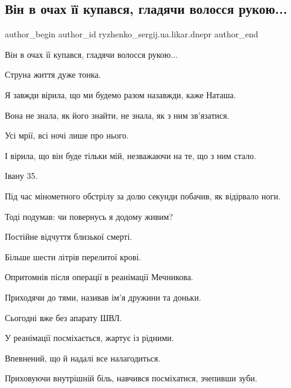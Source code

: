  
 
 
 
 

\subsection{Він в очах її купався, гладячи волосся рукою...}
\label{sec:10_01_2023.fb.ryzhenko_sergij.ua.likar.dnepr.1.v_n_v_ochakh___kupa}

\ifcmt
 author_begin
   author_id ryzhenko_sergij.ua.likar.dnepr
 author_end
\fi

Він в очах її купався, гладячи волосся рукою...

Струна життя дуже тонка.

Я завжди вірила, що ми будемо разом назавжди, каже Наташа.

Вона не знала, як його знайти, не знала, як з ним зв'язатися.

Усі мрії, всі ночі лише про нього.

І вірила, що він буде тільки мій, незважаючи на те, що з ним стало.

Івану 35.

Під час мінометного обстрілу за долю секунди побачив, як відірвало ноги.

Тоді подумав: чи повернусь я додому живим?

Постійне відчуття близької смерті.

Більше шести літрів перелитої крові.

Опритомнів після операції в реанімації Мечникова.

Приходячи до тями, називав ім'я дружини та доньки.

Сьогодні вже без апарату ШВЛ.

У реанімації посміхається, жартує із рідними.

Впевнений, що й надалі все налагодиться.

Приховуючи внутрішній біль, навчився посміхатися, зчепивши зуби.

